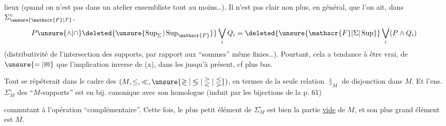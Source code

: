 
lieux (quand on n'est pas dans un atelier ensembliste tout au moins\ldots). Il n'est pas clair non plus, en général, que l'on ait, dans $\Sigma_{\unsure{\mathscr{F}|\mathcal{F}}}^\circ$,
\[
P\unsure{\wedge|\cap}\deleted{\unsure{\operatorname{Sup}_\Sigma|\operatorname{Sup}_{\mathscr{F}}}}\bigvee_i Q_i=\deleted{\unsure{\mathscr{F}|\Sigma|\operatorname{Sup}}}\bigvee_i(P\wedge Q_i)
\]
(distributivité de l'intersection des supports, par rapport aux ``sommes'' même finies\ldots).
Pourtant, cela a tendance à être vrai, de $\unsure{=|\overline m}$ que l'implication inverse de (x), dans les  jusqu'à présent, cf plus bas.

Tout  se répéterait dans le cadre des  $(M,\leq,\ll,\unsure{\gtrless|\lessgtr|\gtreqless|\lesseqgtr})$,  en termes de la seule relation $\parallel_M$  de disjonction dans $M$. Et l'ens. $\Sigma_M^\circ$ des ``$M$-supports'' est en bij. canonique avec son homologue
(induit par les bijections de la p. 61)


commutant à l'opération ``complémentaire''.
Cette fois, le plus petit élément de $\Sigma_M^\circ$ est bien la partie \uline{vide} de $M$, et son plus grand élément est $M$.
